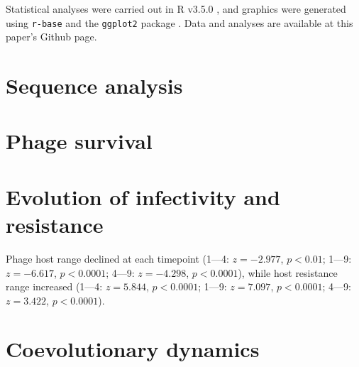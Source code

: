 \documentclass [12pt, a4paper, twoside]  {article}
\begin{document}
Statistical analyses were carried out in R v3.5.0 \citep{R}, and graphics were generated using \texttt{r-base} and the \texttt{ggplot2} package \citep{ggplot2}. Data and analyses are available at this paper's Github page.

\section*{Sequence analysis}


\section*{Phage survival}


\section*{Evolution of infectivity and resistance}
Phage host range declined at each timepoint (1---4: $z = -2.977$, $p < 0.01$; 1---9: $z=-6.617$, $p < 0.0001$; 4---9: $z = -4.298$, $p < 0.0001$), while host resistance range increased (1---4: $z = 5.844$, $p < 0.0001$; 1---9: $z=7.097$, $p < 0.0001$; 4---9: $z = 3.422$, $p < 0.0001$). 

\section*{Coevolutionary dynamics}


\clearpage

\end{document}
